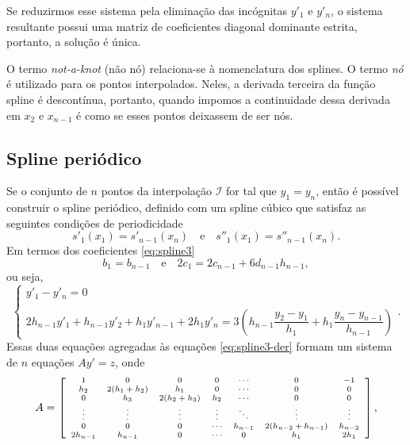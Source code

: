 Se reduzirmos esse sistema pela eliminação das incógnitas $y'_1$ e $y'_n$, o sistema resultante possui uma matriz de coeficientes diagonal dominante estrita, portanto, a solução é única.

O termo \textit{not-a-knot} (não nó) relaciona-se à nomenclatura dos splines. O termo \textit{nó} é utilizado para os pontos interpolados. Neles, a derivada terceira da função spline é descontínua, portanto, quando impomos a continuidade dessa derivada em $x_2$ e $x_{n-1}$ é como se esses pontos deixassem de ser nós.

\subsection{Spline periódico}
Se o conjunto de $n$ pontos da interpolação $\mathcal{I}$ for tal que $y_1=y_n$, então é possível construir o spline periódico, definido com um spline cúbico que satisfaz as seguintes condições de periodicidade
\begin{equation*}
	s'_1(x_1)=s'_{n-1}(x_n)\quad\text{e}\quad	s''_1(x_1)=s''_{n-1}(x_n).
\end{equation*}
Em termos dos coeficientes \eqref{eq:spline3}
\begin{equation*}
	b_1=b_{n-1}\quad\text{e}\quad 2c_1=2c_{n-1}+6d_{n-1}h_{n-1},
\end{equation*}
ou seja,
\begin{equation}
	\left\{\begin{array}{l}
			y'_1-y'_n=0\\
			\\
			2h_{n-1}y'_1+h_{n-1}y'_2+h_1y'_{n-1}+2h_1y'_n=3\left(h_{n-1}\dfrac{y_2-y_1}{h_1}+h_1\dfrac{y_n-y_{n-1}}{h_{n-1}}\right)
		\end{array}
	\right. .
\end{equation}
Essas duas equações agregadas às equações \eqref{eq:spline3-der} formam um sistema de $n$ equações $Ay' = z$, onde
\begin{equation*}
	\begin{scriptsize}
		A=\left[\begin{array}{ccccccc}
			1&0&0&0&\cdots&0&-1\\
			h_2&2(h_1+h_2)&h_1&0&\cdots&0&0\\
			0&h_3&2(h_2+h_3)&h_2&\cdots&0&0\\
			\vdots&\vdots&\vdots&\vdots&\ddots&\vdots&\vdots\\
			0&0&0&\cdots&h_{n-1} & 2(h_{n-2}+h_{n-1})&h_{n-2}\\
			2h_{n-1}&h_{n-1}&0&\cdots &0&h_1&2h_1
			\end{array}\right],
	\end{scriptsize}
\end{equation*}
